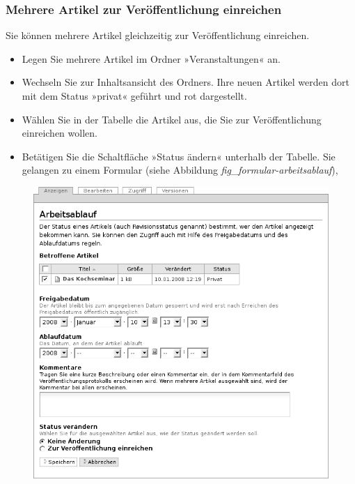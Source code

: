 \documentclass[a4paper,12pt,ngerman]{manual}
\begin{document}
\subsubsection{Mehrere Artikel zur Veröffentlichung einreichen}

Sie können mehrere Artikel gleichzeitig zur Veröffentlichung einreichen.
\begin{itemize}
\item {} 
Legen Sie mehrere Artikel im Ordner »Veranstaltungen« an.

\item {} 
Wechseln Sie zur Inhaltsansicht des Ordners. Ihre neuen Artikel werden
dort mit dem Status »privat« geführt und rot dargestellt.

\item {} 
Wählen Sie in der Tabelle die Artikel aus, die Sie zur Veröffentlichung
einreichen wollen.

\item {} 
Betätigen Sie die Schaltfläche »Status ändern« unterhalb der
Tabelle. Sie gelangen zu einem Formular (siehe
Abbildung \emph{fig\_formular-arbeitsablauf}),

\end{itemize}
\begin{figure}[htbp]
\centering

\includegraphics{formular-arbeitsablauf.png}
\end{figure}
\end{document}
